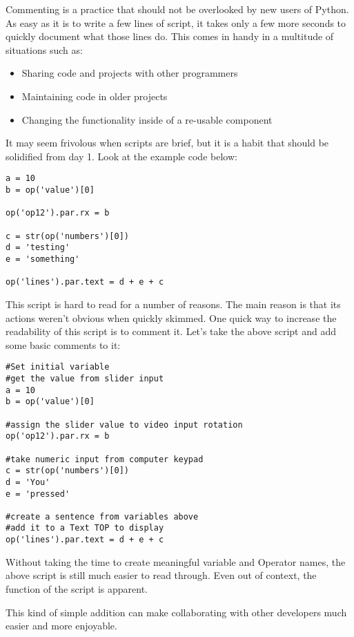 \begin{fullwidth}

Commenting is a practice that should not be overlooked by new users of Python. As easy as it is to write a few lines of script, it takes only a few more seconds to quickly document what those lines do. This comes in handy in a multitude of situations such as:

\begin{itemize}
\item Sharing code and projects with other programmers
\item Maintaining code in older projects
\item Changing the functionality inside of a re-usable component
\end{itemize}


It may seem frivolous when scripts are brief, but it is a habit that should be solidified from day 1. Look at the example code below:

\begin{lstlisting}
a = 10
b = op('value')[0]

op('op12').par.rx = b

c = str(op('numbers')[0])
d = 'testing'
e = 'something'

op('lines').par.text = d + e + c
\end{lstlisting}

This script is hard to read for a number of reasons. The main reason is that its actions weren't obvious when quickly skimmed. One quick way to increase the readability of this script is to comment it. Let's take the above script and add some basic comments to it:

\begin{lstlisting}
#Set initial variable
#get the value from slider input
a = 10
b = op('value')[0]

#assign the slider value to video input rotation
op('op12').par.rx = b

#take numeric input from computer keypad
c = str(op('numbers')[0])
d = 'You'
e = 'pressed'

#create a sentence from variables above
#add it to a Text TOP to display
op('lines').par.text = d + e + c
\end{lstlisting}

Without taking the time to create meaningful variable and Operator names, the above script is still much easier to read through. Even out of context, the function of the script is apparent. 

This kind of simple addition can make collaborating with other developers much easier and more enjoyable.

\end{fullwidth}



